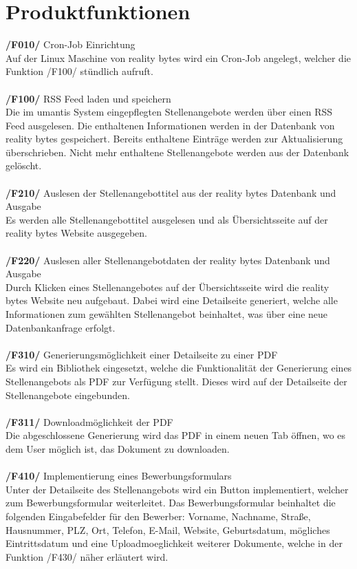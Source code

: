 \section{Produktfunktionen}
\textbf{/F010/} Cron-Job Einrichtung \\
Auf der Linux Maschine von reality bytes wird ein Cron-Job angelegt, welcher die Funktion /F100/ stündlich aufruft.
\\ \\
\textbf{/F100/} RSS Feed laden und speichern \\
Die im umantis System eingepflegten Stellenangebote werden über einen RSS Feed ausgelesen.
Die enthaltenen Informationen werden in der Datenbank von reality bytes gespeichert.
Bereits enthaltene Einträge werden zur Aktualisierung überschrieben.
Nicht mehr enthaltene Stellenangebote werden aus der Datenbank gelöscht.
\\ \\
\textbf{/F210/} Auslesen der Stellenangebottitel aus der reality bytes Datenbank und Ausgabe \\
Es werden alle Stellenangebottitel ausgelesen und als Übersichtsseite auf der reality bytes Website ausgegeben.
\\ \\
\textbf{/F220/} Auslesen aller Stellenangebotdaten der reality bytes Datenbank und Ausgabe \\
Durch Klicken eines Stellenangebotes auf der Übersichtsseite wird die reality bytes Website neu aufgebaut. Dabei wird eine Detailseite generiert, welche alle Informationen zum gewählten Stellenangebot beinhaltet, was über eine neue Datenbankanfrage erfolgt.
\\ \\
\textbf{/F310/} Generierungsmöglichkeit einer Detailseite zu einer PDF \\
Es wird ein Bibliothek eingesetzt, welche die Funktionalität der Generierung eines Stellenangebots als PDF zur Verfügung stellt. Dieses wird auf der Detailseite der Stellenangebote eingebunden.
\\ \\
\textbf{/F311/} Downloadmöglichkeit der PDF \\
Die abgeschlossene Generierung wird das PDF in einem neuen Tab öffnen, wo es dem \gls{User} möglich ist, das Dokument zu downloaden.
\\ \\
\textbf{/F410/} Implementierung eines Bewerbungsformulars \\
Unter der Detailseite des Stellenangebots wird ein \gls{Button} implementiert, welcher zum Bewerbungsformular weiterleitet. Das Bewerbungsformular beinhaltet die folgenden Eingabefelder für den Bewerber: Vorname, Nachname, Straße, Hausnummer, PLZ, Ort, Telefon, E-Mail, Website, Geburtsdatum, mögliches Eintrittsdatum und eine \gls{Uploadmoeglichkeit} weiterer Dokumente, welche in der Funktion /F430/ näher erläutert wird.
